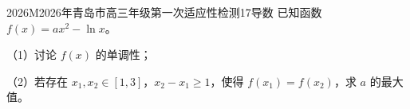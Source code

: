 
\begin{problem}{2026}{M}{2026年青岛市高三年级第一次适应性检测}{17}{导数}
已知函数 $f(x)=ax^2-\ln x$。

（1）讨论 $f(x)$ 的单调性；

（2）若存在 $x_1,x_2\in[1,3]$，$x_2-x_1\ge1$，使得 $f(x_1)=f(x_2)$，求 $a$ 的最大值。
\end{problem}